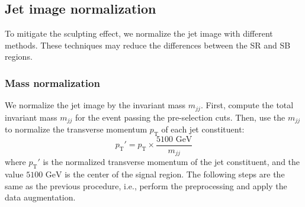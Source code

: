 \documentclass[12pt]{article}
\begin{document}
    \subsection{Jet image normalization}%
    \label{sub:jet_image_normalization}
        To mitigate the sculpting effect, we normalize the jet image with different methods. These techniques may reduce the differences between the SR and SB regions.
        \subsubsection{Mass normalization}%
        \label{subs:mass_normalization}
            We normalize the jet image by the invariant mass $m_{jj}$. First, compute the total invariant mass $m_{jj}$ for the event passing the pre-selection cuts. Then, use the $m_{jj}$ to normalize the transverse momentum $p_{\text{T}}$ of each jet constituent:
            \begin{equation}
                p_{\text{T}}' = p _{\text{T}} \times  \frac{\text{5100 GeV}}{m_{jj}}
            \end{equation}
            where $p_{\text{T}}'$ is the normalized transverse momentum of the jet constituent, and the value $5100 \text{ GeV}$ is the center of the signal region. The following steps are the same as the previous procedure, i.e., perform the preprocessing and apply the data augmentation.
\end{document}
